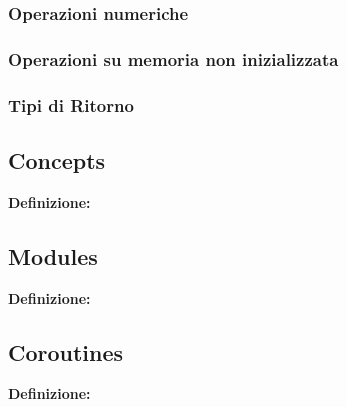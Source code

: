 \subsubsection{Operazioni numeriche}
\subsubsection{Operazioni su memoria non inizializzata}
\subsubsection{Tipi di Ritorno}

\newpage

\subsection{Concepts}


\textsf{\small \textbf{Definizione: } } \\

\newpage

\subsection{Modules}

\textsf{\small \textbf{Definizione: } } \\

\newpage

\subsection{Coroutines}


\textsf{\small \textbf{Definizione: } } \\

